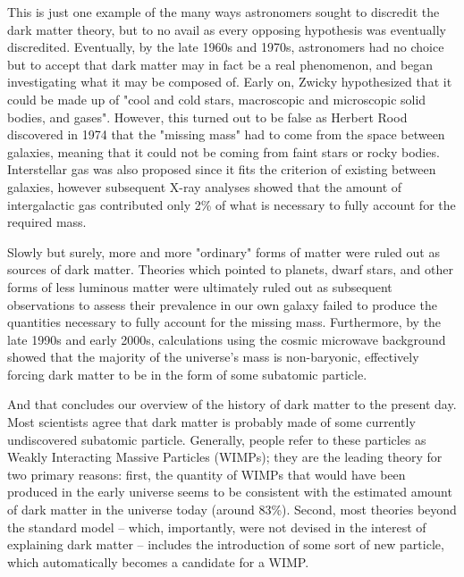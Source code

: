 This is just one example of the many ways astronomers sought to discredit the dark matter theory, but to no
avail as every opposing hypothesis was eventually discredited. Eventually, by the late 1960s and 1970s,
astronomers had no choice but to accept that dark matter may in fact be a real phenomenon, and began
investigating what it may be composed of. Early on, Zwicky hypothesized that it could be made up of "cool and
cold stars, macroscopic and microscopic solid bodies, and gases". However, this turned out to be false as
Herbert Rood discovered in 1974 that the "missing mass" had to come from the space between galaxies, meaning
that it could not be coming from faint stars or rocky bodies. Interstellar gas was also proposed since it
fits the criterion of existing between galaxies, however subsequent X-ray analyses showed that the amount of
intergalactic gas contributed only 2\% of what is necessary to fully account for the required mass.   

Slowly but surely, more and more "ordinary" forms of matter were ruled out as sources of dark matter.
Theories which pointed to planets, dwarf stars, and other forms of less luminous matter were ultimately ruled
out as subsequent observations to assess their prevalence in our own galaxy failed to produce the quantities
necessary to fully account for the missing mass. Furthermore, by the late 1990s and early 2000s, calculations
using the cosmic microwave background showed that the majority of the universe's mass is non-baryonic,
effectively forcing dark matter to be in the form of some subatomic particle.     

And that concludes our overview of the history of dark matter to the present day. Most scientists agree
that dark matter is probably made of some currently undiscovered subatomic particle. Generally, people refer
to these particles as Weakly Interacting Massive Particles (WIMPs); they are the leading theory for two primary
reasons: first, the quantity of WIMPs that would have been produced in the early universe seems to be consistent
with the estimated amount of dark matter in the universe today (around 83\%). Second, most theories beyond the
standard model -- which, importantly, were not devised in the interest of explaining dark matter -- includes
the introduction of some sort of new particle, which automatically becomes a candidate for a WIMP.   


